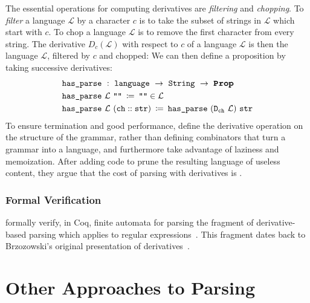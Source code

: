     The essential operations for computing derivatives are \emph{filtering} and \emph{chopping}.  To \emph{filter} a language $\mathcal L$ by a character $c$ is to take the subset of strings in $\mathcal L$ which start with $c$.  To chop a language $\mathcal L$ is to remove the first character from every string.  The derivative $D_c(\mathcal L)$ with respect to $c$ of a language $\mathcal L$ is then the language $\mathcal L$, filtered by $c$ and chopped:
%
      We can then define a  proposition by taking successive derivatives:
\begin{align*}
&\fname{has\_parse}~:~\coqtype{language}~\to~\coqtype{String}~\to~\Prop \\
&\fname{has\_parse}~\mathcal{L}~\str{} \functiondefeq \str{}\in\mathcal{L} \\
&\fname{has\_parse}~\mathcal{L}~(\cons{\farg{ch}}{\farg{str}}) \functiondefeq \fname{has\_parse}~(\fname{D\ensuremath{_{\farg{ch}}}}~\mathcal L)~\farg{str}
\end{align*}
      To ensure termination and good performance, \citeauthor*{Derivs} define the derivative operation on the structure of the grammar, rather than defining combinators that turn a grammar into a language, and furthermore take advantage of laziness and memoization.  After adding code to prune the resulting language of useless content, they argue that the cost of parsing with derivatives is .
      
    \subsubsection{Formal Verification}
       formally verify, in Coq, finite automata for parsing the fragment of derivative-based parsing which applies to regular expressions~\cite{DerivsCoq}.  This fragment dates back to Brzozowski's original presentation of derivatives~\cite{BrzozowskiDerivs}.
  
  \section{Other Approaches to Parsing}
    
